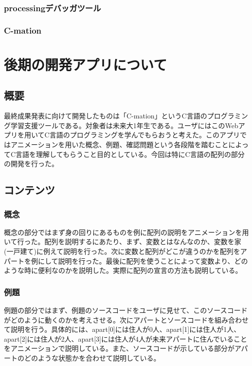 \documentclass[openany,11pt,papersize]{jsbook}
\begin{document}
\subsection{processingデバッガツール}

\subsection{C-mation}



\chapter{後期の開発アプリについて}

\section{概要}
最終成果発表に向けて開発したものは「C-mation」というC言語のプログラミング学習支援ツールである。対象者は未来大1年生である。ユーザにはこのWebアプリを用いてC言語のプログラミングを学んでもらおうと考えた。このアプリではアニメーションを用いた概念、例題、確認問題という各段階を踏むことによってC言語を理解してもらうこと目的としている。今回は特にC言語の配列の部分の開発を行った。
\section{コンテンツ}

\subsection{概念}
概念の部分ではまず身の回りにあるものを例に配列の説明をアニメーションを用いて行った。配列を説明するにあたり、まず、変数とはなんなのか、変数を家(一戸建て)に例えて説明を行った。次に変数と配列がどこが違うのかを配列をアパートを例にして説明を行った。最後に配列を使うことによって変数より、どのような時に便利なのかを説明した。実際に配列の宣言の方法も説明している。
\subsection{例題}
例題の部分ではまず、例題のソースコードをユーザに見せて、このソースコードがどのように動くのかを考えさせる。次にアパートとソースコードを組み合わせて説明を行う。具体的には、apart[0]には住人が0人、apart[1]には住人が1人、apart[2]には住人が2人、apart[3]には住人が4人が未来アパートに住んでいることをアニメーションで説明している。また、ソースコードが示している部分がアパートのどのような状態かを合わせて説明している。
\end{document}
